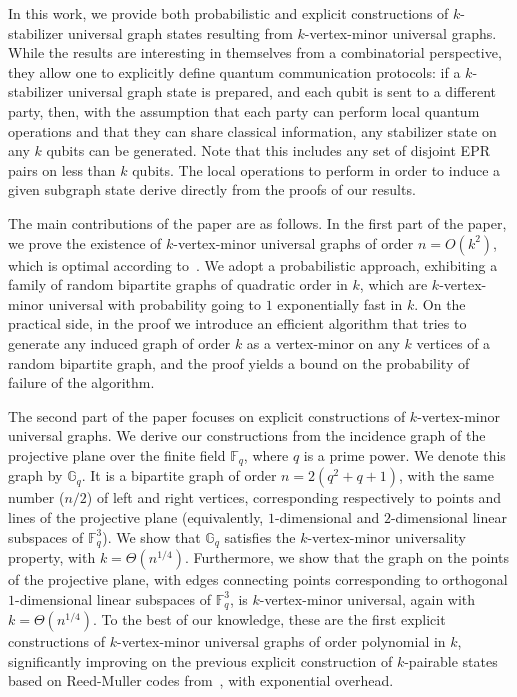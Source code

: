 \documentclass[10pt,a4paper]{article}
\begin{document}
In this work, we provide both probabilistic and explicit constructions of $k$-stabilizer universal graph states resulting from $k$-vertex-minor universal graphs. While the results are interesting in themselves from a combinatorial perspective, they allow one to explicitly define quantum communication protocols: if a $k$-stabilizer universal graph state is prepared, and each qubit is sent to a different party, then, with the assumption that each party can perform local quantum operations and that they can share classical information, any stabilizer state on any $k$ qubits can be generated. Note that this includes any set of disjoint EPR pairs on less than $k$ qubits. The local operations to perform in order to induce a given subgraph state derive directly  from the proofs of our results. 

The main contributions of the paper are as follows. 
In the first part of the paper, we prove the existence of $k$-vertex-minor universal graphs of order $n=O(k^2)$, which is optimal according to~\cite{claudet2023small}. We adopt a probabilistic approach, exhibiting a family of random bipartite graphs of quadratic order in $k$, which are $k$-vertex-minor universal with  probability going to $1$ exponentially fast in $k$. On the practical side, in the proof we introduce an efficient algorithm that tries to generate any induced graph of order $k$ as a vertex-minor on any $k$ vertices of a random bipartite graph, and the proof yields a bound on the probability of failure of the algorithm.

The second part of the paper focuses on explicit constructions of $k$-vertex-minor universal graphs. We derive our constructions from the incidence graph of the projective plane over the finite field  $\mathbb{F}_q$, where $q$ is a prime power. We denote this graph by $\mathbb{G}_q$. It is a bipartite graph of order $n=2(q^2+q+1)$, with the same number ($n/2$) of left and right vertices, corresponding respectively to points and lines of the projective plane (equivalently,  $1$-dimensional and $2$-dimensional linear subspaces of $\mathbb{F}_q^3$).  We show  that $\mathbb{G}_q$ satisfies the $k$-vertex-minor universality property, with $k = \Theta(n^{1/4})$. Furthermore, we show that the  graph on the points of the projective plane, with edges connecting points corresponding to orthogonal $1$-dimensional linear subspaces of $\mathbb{F}_q^3$, is $k$-vertex-minor universal, again with $k = \Theta(n^{1/4})$. To the best of our knowledge, these are the first explicit constructions of $k$-vertex-minor universal graphs of order polynomial in $k$, significantly improving on the previous explicit construction of $k$-pairable states based on Reed-Muller codes from~\cite{bravyi2022generating}, with exponential overhead.
\end{document}
